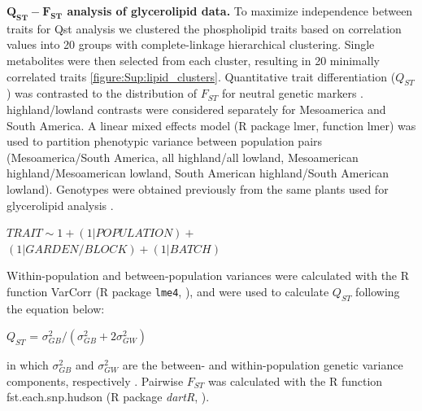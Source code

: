 \documentclass[9pt,twocolumn,twoside,lineno]{biorxiv}
\begin{document}
\textbf{$\mathbf{Q_{ST}-F_{ST}}$ analysis of glycerolipid data.}
To maximize independence between traits for Qst analysis we clustered the phospholipid traits based on correlation values into 20 groups with complete-linkage hierarchical clustering. Single metabolites were then selected from each cluster, resulting in 20 minimally correlated traits \cref{figure:Sup:lipid_clusters}. Quantitative trait differentiation ($Q_{ST}$) was contrasted to the distribution of $F_{ST}$ for neutral genetic markers \cite{whitlock2008evolutionary}. 
highland/lowland contrasts were considered separately for Mesoamerica and South America.
A linear mixed effects model (R package lmer, function lmer) was used to partition phenotypic variance between population pairs (Mesoamerica/South America, all highland/all lowland, Mesoamerican highland/Mesoamerican lowland, South American highland/South American lowland). 
Genotypes were obtained previously from the same plants used for glycerolipid analysis \cite{Janzen2021-lz}.
\begin{center}
${ TRAIT \sim 1 + (1|POPULATION) + }$\\
${(1|GARDEN/BLOCK) + (1|BATCH)}$
\end{center}
Within-population and between-population variances were calculated with the R function VarCorr (R package \texttt{lme4}, \citealp{bates2014lme4}), and were used to calculate $Q_{ST}$ following the equation below:
\begin{center}
$Q_{ST}$ = \(\sigma^{2}_{GB}/(\sigma^{2}_{GB}+2\sigma^{2}_{GW})\)
\end{center}
\noindent in which $\sigma^{2}_{GB}$ and $\sigma^{2}_{GW}$ are the between- and within-population genetic variance components, respectively \cite{Leinonen2013-ic}.
Pairwise $F_{ST}$ was calculated with the R function fst.each.snp.hudson (R package \textit{dartR}, \citealp{gruber2018dartr}).
\end{document}
